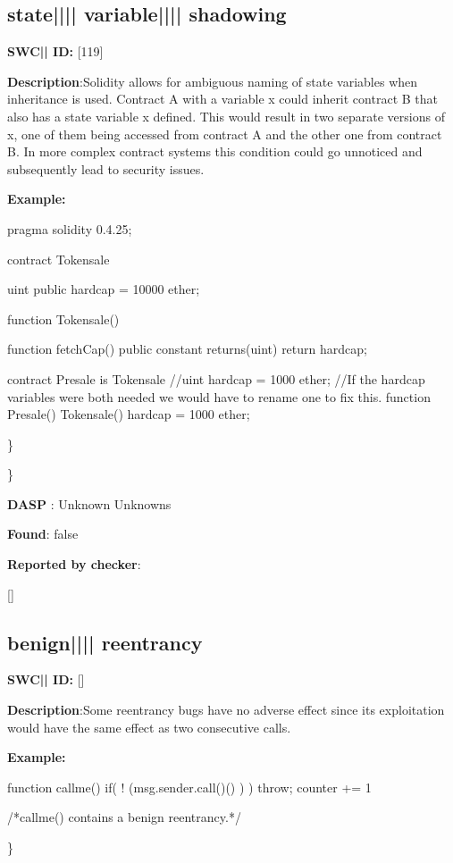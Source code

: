 \documentclass{article}
\begin{document}
\subsection{state{||\textunderscore|| }variable{||\textunderscore|| }shadowing} 
\textbf{SWC{|\textunderscore| }ID:} [119]

\textbf{Description}:Solidity allows for ambiguous naming of state variables when inheritance is used. Contract A with a variable x could inherit contract B that also has a state variable x defined. This would result in two separate versions of x, one of them being accessed from contract A and the other one from contract B. In more complex contract systems this condition could go unnoticed and subsequently lead to security issues.


\textbf{Example:} 
\begin{ffcode} 

pragma solidity 0.4.25;

contract Tokensale {
    uint public hardcap = 10000 ether;

    function Tokensale() {}

    function fetchCap() public constant returns(uint) {
        return hardcap;
    }
}

contract Presale is Tokensale {
    //uint hardcap = 1000 ether;
    //If the hardcap variables were both needed we would have to rename one to fix this.
    function Presale() Tokensale() {
        hardcap = 1000 ether;
    }
}

\end{ffcode} 
\} 

\} 

\textbf{DASP} : Unknown Unknowns

\textbf{Found}: false

\textbf{Reported by checker}: 
\begin{ffcode} 

[]
\end{ffcode} 
\subsection{benign{||\textunderscore|| }reentrancy} 
\textbf{SWC{|\textunderscore| }ID:} []

\textbf{Description}:Some re{\textendash}entrancy bugs have no adverse effect since its exploitation would have the same effect as two consecutive calls.


\textbf{Example:} 
\begin{ffcode} 

function callme(){
  if( ! (msg.sender.call()() ) ){
    throw;
  }
  counter += 1
}

 /*callme() contains a benign reentrancy.*/ 

\end{ffcode} 
\} 
\end{document}
